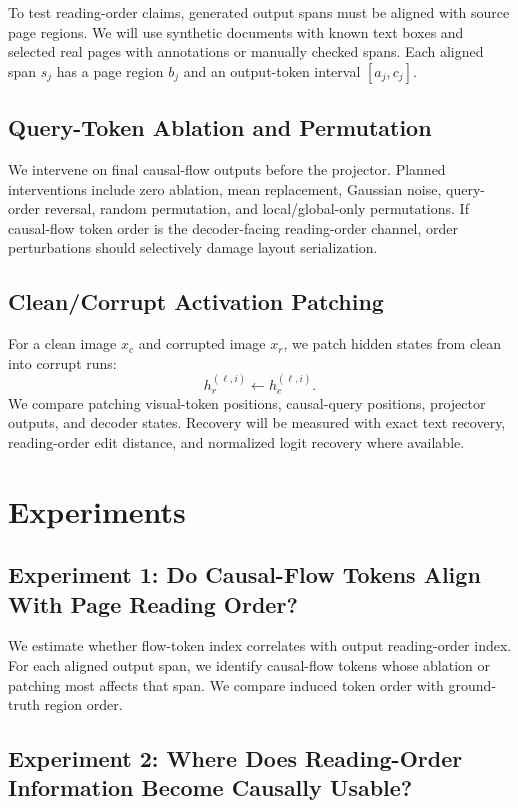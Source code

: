 \documentclass{article}
\begin{document}
To test reading-order claims, generated output spans must be aligned with source page regions. We will use synthetic documents with known text boxes and selected real pages with annotations or manually checked spans. Each aligned span $s_j$ has a page region $b_j$ and an output-token interval $[a_j, c_j]$.

\subsection{Query-Token Ablation and Permutation}

We intervene on final causal-flow outputs before the projector. Planned interventions include zero ablation, mean replacement, Gaussian noise, query-order reversal, random permutation, and local/global-only permutations. If causal-flow token order is the decoder-facing reading-order channel, order perturbations should selectively damage layout serialization.

\subsection{Clean/Corrupt Activation Patching}

For a clean image $x_c$ and corrupted image $x_r$, we patch hidden states from clean into corrupt runs:
\begin{equation}
  h_r^{(\ell, i)} \leftarrow h_c^{(\ell, i)}.
\end{equation}
We compare patching visual-token positions, causal-query positions, projector outputs, and decoder states. Recovery will be measured with exact text recovery, reading-order edit distance, and normalized logit recovery where available.

\section{Experiments}

\subsection{Experiment 1: Do Causal-Flow Tokens Align With Page Reading Order?}

We estimate whether flow-token index correlates with output reading-order index. For each aligned output span, we identify causal-flow tokens whose ablation or patching most affects that span. We compare induced token order with ground-truth region order.

\subsection{Experiment 2: Where Does Reading-Order Information Become Causally Usable?}
\end{document}

